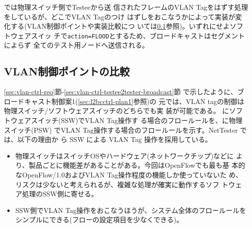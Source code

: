 では物理スイッチ側でTesteeから送
信されたフレームのVLAN Tagをはずす処理をしているが、どこでVLAN Tagのつけ
はずしをおこなうかによって実装が変化する(VLAN制御ポイントや実装比較につ
いては\ref{sec:vlan_control_point}参照)。いずれにせよソフトウェアスイッ
チで\verb|action=FLOOD|とするため、ブロードキャストはセグメントによらず
全てのテスト用ノードへ送信される。

  \subsection{VLAN制御ポイントの比較}
  \label{sec:vlan_control_point}

\ref{sec:vlan-ctrl-req}節-\ref{sec:vlan-ctrl-testee2tester-broadcast}節
で示したように、ブロードキャスト制御案1(\ref{sec:l2bcctrl-plan1}参照)の
元では、VLAN tagの制御は物理スイッチ/ソフトウェアスイッチのどちらでも実
装が可能である。
にソフトウェアスイッチ(SSW)でVLAN Tag操作す
る場合のフロールールを、に物理スイッチ(PSW)
でVLAN Tag操作する場合のフロールールを示す。NetTester では、以下の理由か
ら SSW による VLAN Tag 操作を採用している。
\begin{itemize}
 \item 物理スイッチはスイッチOSやハードウェア(ネットワークチップ)などに
       より、製品ごとに機能差があることがある。今回はOpenFlowでも最も基
       本的なOpenFlow/1.0およびVLAN Tag操作程度の機能しか使っていないた
       め、リスクは少ないと考えられるが、複雑な処理が確実に動作するソフ
       トウェア処理のSSW側に寄せる。
 \item SSW側でVLAN Tag操作をおこなうほうが、システム全体のフロールールを
       シンプルにできる(フローの設定項目を少なくできる)。
\end{itemize}

